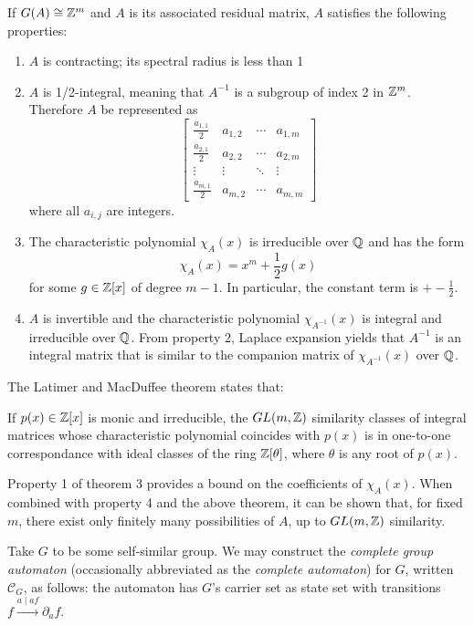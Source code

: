 \documentclass[11pt, titlepage]{article}
\begin{document}
\begin{theorem}
If $G(A) \cong \mathbb{Z}^m$ and $A$ is its associated
residual matrix, $A$ satisfies the following properties:
\begin{enumerate}
\item $A$ is contracting; its spectral radius is less than 1
\item $A$ is 1/2-integral, meaning that $A^{-1}$ is a subgroup of
  index 2 in $\mathbb{Z}^m$. Therefore $A$ be represented as
  \[
    \begin{bmatrix}
      \frac{a_{1,1}}{2} & a_{1,2} & \cdots & a_{1,m} \\
      \frac{a_{2,1}}{2} & a_{2,2} & \cdots & a_{2,m} \\
      \vdots & \vdots & \ddots & \vdots \\
      \frac{a_{m,1}}{2} & a_{m,2} & \cdots & a_{m,m}
    \end{bmatrix}
  \]
  where all
  $a_{i,j}$ are integers.
\item The characteristic polynomial $\chi_A(x)$ is irreducible over
  $\mathbb{Q}$ and has the form
  \[ \chi_A(x) = x^m + \frac{1}{2}g(x) \] for some $g \in \mathbb{Z}[x]$ of
  degree $m-1$. In particular, the constant term is $+-\frac{1}{2}$.
\item $A$ is invertible and the characteristic polynomial
  $\chi_{A^{-1}}(x)$ is integral and irreducible over $\mathbb{Q}$. From
  property 2, Laplace expansion yields that $A^{-1}$ is an integral
  matrix that is similar to the companion matrix of $\chi_{A^{-1}}(x)$
  over $\mathbb{Q}$.
\end{enumerate}
\end{theorem}

The Latimer and MacDuffee theorem states that:

\begin{theorem}
  If $p(x) \in \mathbb{Z}[x]$ is monic and irreducible, the $GL(m, \mathbb{Z})$
  similarity classes of integral matrices whose characteristic
  polynomial coincides with $p(x)$ is in one-to-one correspondance
  with ideal classes of the ring $\mathbb{Z}[\theta]$, where $\theta$ is any
  root of $p(x)$.
\end{theorem}

Property 1 of theorem 3 provides a bound on the coefficients of
$\chi_A(x)$. When combined with property 4 and the above theorem, it
can be shown that, for fixed $m$, there exist only finitely many
possibilities of $A$, up to $GL(m, \mathbb{Z})$ similarity.

\begin{definition}
  Take $G$ to be some self-similar group. We may construct the
  \emph{complete group automaton} (occasionally abbreviated as the
  \emph{complete automaton}) for $G$, written $\mathcal{C}_G$, as
  follows: the automaton has $G$'s carrier set as state set with
  transitions $f \stackrel{a\mid af}{\longrightarrow} \partial_a f$.
\end{definition}
\end{document}

